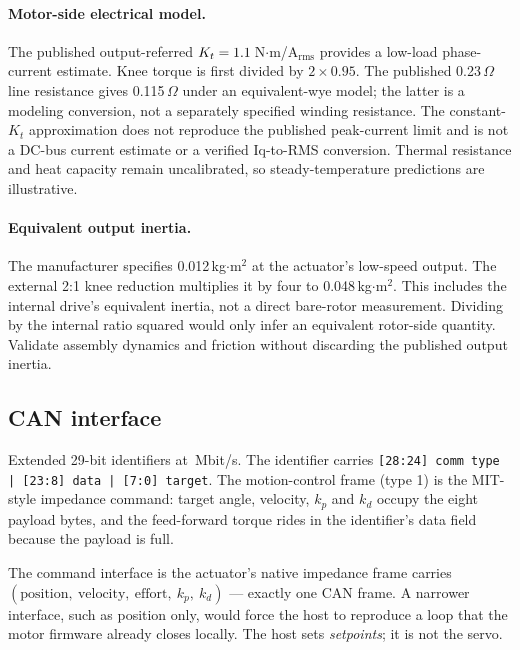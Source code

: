 \documentclass[11pt,a4paper]{article}
\begin{document}
\paragraph{Motor-side electrical model.} The published output-referred
$K_t=1.1$\,N$\cdot$m/A$_{\mathrm{rms}}$ provides a low-load phase-current
estimate. Knee torque is first divided by $2\times0.95$. The published
0.23\,$\Omega$ line resistance gives 0.115\,$\Omega$ under an equivalent-wye
model; the latter is a modeling conversion, not a separately specified winding
resistance. The constant-$K_t$ approximation does not reproduce the published
peak-current limit and is not a DC-bus current estimate or a verified Iq-to-RMS
conversion. Thermal resistance and heat capacity remain uncalibrated, so
steady-temperature predictions are illustrative.

\paragraph{Equivalent output inertia.} The manufacturer specifies
0.012\,kg$\cdot$m$^2$ at the actuator's low-speed output. The external 2:1
knee reduction multiplies it by four to 0.048\,kg$\cdot$m$^2$. This includes
the internal drive's equivalent inertia, not a direct bare-rotor measurement.
Dividing by the internal ratio squared would only infer an equivalent rotor-side
quantity. Validate assembly dynamics and friction without discarding the
published output inertia.

\subsection{CAN interface}

Extended 29-bit identifiers at \RdCanRate\,Mbit/s. The identifier carries
\texttt{[28:24] comm type | [23:8] data | [7:0] target}. The motion-control
frame (type 1) is the MIT-style impedance command: target angle, velocity, $k_p$
and $k_d$ occupy the eight payload bytes, and the feed-forward torque rides in
the identifier's data field because the payload is full.

\begin{decision}{The command interface is the actuator's native impedance frame}
 carries $(\text{position},\ \text{velocity},\ \text{effort},\
k_p,\ k_d)$ --- exactly one CAN frame. A narrower interface, such as position
only, would force the host to reproduce a loop that the motor firmware already
closes locally. The host sets \emph{setpoints}; it is not the servo.
\end{decision}
\end{document}
